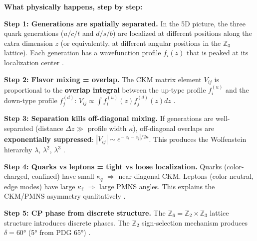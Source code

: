 \begin{tcolorbox}[colback=green!5!white, colframe=green!50!black,
    title=\textbf{The CKM Mechanism in EDC: Physical Process}]
\textbf{What physically happens, step by step:}

\textbf{Step 1: Generations are spatially separated.}
In the 5D picture, the three quark generations ($u/c/t$ and $d/s/b$) are localized
at different positions along the extra dimension $z$ (or equivalently, at different
angular positions in the $\mathbb{Z}_3$ lattice). Each generation has a wavefunction
profile $f_i(z)$ that is peaked at its localization center \tagP{}.

\textbf{Step 2: Flavor mixing = overlap.}
The CKM matrix element $V_{ij}$ is proportional to the \textbf{overlap integral}
between the up-type profile $f_i^{(u)}$ and the down-type profile $f_j^{(d)}$:
$V_{ij} \propto \int f_i^{(u)}(z) f_j^{(d)}(z) dz$ \tagDc{}.

\textbf{Step 3: Separation kills off-diagonal mixing.}
If generations are well-separated (distance $\Delta z \gg$ profile width $\kappa$),
off-diagonal overlaps are \textbf{exponentially suppressed}: $|V_{ij}| \sim e^{-|z_i - z_j|/2\kappa}$.
This produces the Wolfenstein hierarchy $\lambda$, $\lambda^2$, $\lambda^3$ \tagDc{}.

\textbf{Step 4: Quarks vs leptons = tight vs loose localization.}
Quarks (color-charged, confined) have small $\kappa_q$ $\Rightarrow$ near-diagonal CKM.
Leptons (color-neutral, edge modes) have large $\kappa_\ell$ $\Rightarrow$ large PMNS angles.
This explains the CKM/PMNS asymmetry qualitatively \tagI{}.

\textbf{Step 5: CP phase from discrete structure.}
The $\mathbb{Z}_6 = \mathbb{Z}_2 \times \mathbb{Z}_3$ lattice structure introduces
discrete phases. The $\mathbb{Z}_2$ sign-selection mechanism produces $\delta = 60°$
(5° from PDG 65°) \tagDc{}.
\end{tcolorbox}


